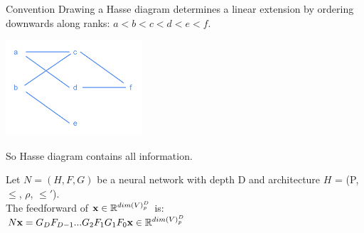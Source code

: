 Convention Drawing a Hasse diagram determines a linear extension by ordering downwards along ranks: $a < b < c < d < e < f$.\\
    \begin{center}
        \includegraphics[width=2in]{images/Chapter 10/convention.png}
    \end{center}
So Hasse diagram contains all information.\\


\begin{definition}
    Let $N = (H,F,G)$ be a neural network with depth D and architecture $H$ = (P, $\leq$, $\rho$, $\leq'$).\\
    The feedforward of ${\vx} \in \mathbb{R}^{dim(V)_p^{D}}$ is:\\
        $N{\vx} = G_{D}F_{D-1}...G_{2}F_{1}G_{1}F_{0}{\vx} \in \mathbb{R}^{dim(V)_p^{D}}$
\end{definition}

